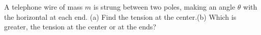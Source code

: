 A telephone wire of mass $m$ is strung between two poles, making an
angle $\theta$ with the horizontal at each end. (a) Find the tension at
the center.\answercheck\hwendpart (b) Which is greater, the tension at the center or at the
ends?
